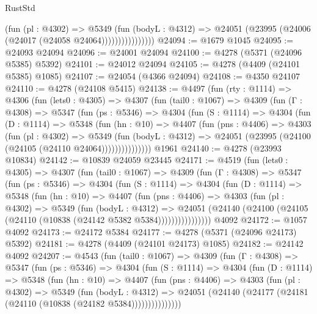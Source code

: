 \begin{lexlean}{RustStd}
\begin{coremodule}
                        (fun (pl : @4302) =>
                        @5349
                          (fun (bodyL : @4312) =>
                          @24051 (@23995 (@24006 (@24017 (@24058 @24064))))))))))))))))
@24094 := @1679 @1045
@24095 := @24093 @24094
@24096 := @24001 @24094
@24100 := @4278 (@5371 (@24096 @5385) @5392)
@24101 := @24012 @24094
@24105 := @4278 (@4409 (@24101 @5385) @1085)
@24107 := @24054 (@4366 @24094)
@24108 := @4350 @24107
@24110 := @4278 (@24108 @5415)
@24138 := @4497
    (fun (rty : @1114) =>
    @4306
      (fun (lets0 : @4305) =>
      @4307
        (fun (tail0 : @1067) =>
        @4309
          (fun (Γ : @4308) =>
          @5347
            (fun (ps : @5346) =>
            @4304
              (fun (S : @1114) =>
              @4304
                (fun (D : @1114) =>
                @5348
                  (fun (hn : @10) =>
                  @4407
                    (fun (pns : @4406) =>
                    @4303
                      (fun (pl : @4302) =>
                      @5349
                        (fun (bodyL : @4312) =>
                        @24051 (@23995 (@24100 (@24105 (@24110 @24064)))))))))))))))
    @1961
@24140 := @4278 (@23993 @10834)
@24142 := @10839 @24059 @23445
@24171 := @4519
    (fun (lets0 : @4305) =>
    @4307
      (fun (tail0 : @1067) =>
      @4309
        (fun (Γ : @4308) =>
        @5347
          (fun (ps : @5346) =>
          @4304
            (fun (S : @1114) =>
            @4304
              (fun (D : @1114) =>
              @5348
                (fun (hn : @10) =>
                @4407
                  (fun (pns : @4406) =>
                  @4303
                    (fun (pl : @4302) =>
                    @5349
                      (fun (bodyL : @4312) =>
                      @24051
                        (@24140 (@24100 (@24105 (@24110 (@10838 (@24142 @5382 @5384))))))))))))))))
    @4092
@24172 := @1057 @4092
@24173 := @24172 @5384
@24177 := @4278 (@5371 (@24096 @24173) @5392)
@24181 := @4278 (@4409 (@24101 @24173) @1085)
@24182 := @24142 @4092
@24207 := @4543
    (fun (tail0 : @1067) =>
    @4309
      (fun (Γ : @4308) =>
      @5347
        (fun (ps : @5346) =>
        @4304
          (fun (S : @1114) =>
          @4304
            (fun (D : @1114) =>
            @5348
              (fun (hn : @10) =>
              @4407
                (fun (pns : @4406) =>
                @4303
                  (fun (pl : @4302) =>
                  @5349
                    (fun (bodyL : @4312) =>
                    @24051 (@24140 (@24177 (@24181 (@24110 (@10838 (@24182 @5384)))))))))))))))

\end{coremodule}
\end{lexlean}
